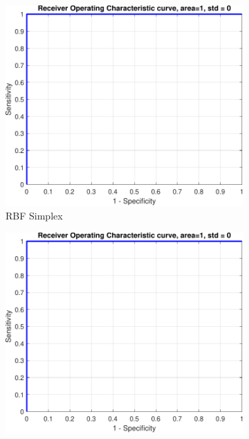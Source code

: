 \documentclass{article}
\begin{document}
            \begin{figure}[h]
            
                 \centering
                 \begin{subfigure}[b]{0.3\textwidth}
                     \centering
                     \includegraphics[width=\textwidth]{Assignment 1/figures/simplex_rbf_classifier_roc.pdf}
                    \caption{RBF Simplex}
                     \label{fig:roc_rbf_simplex_tuned}
                 \end{subfigure}
                 \hfill
                 \begin{subfigure}[b]{0.3\textwidth}
                     \centering
                     \includegraphics[width=\textwidth]{Assignment 1/figures/gridsearch_rbf_classifier_roc.pdf}

\end{subfigure}
\end{figure}
\end{document}
